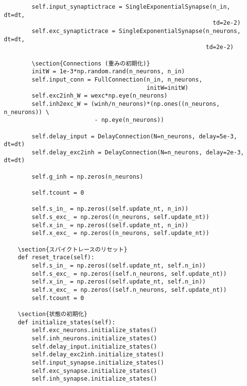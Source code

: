 \begin{verbatim}
        self.input_synaptictrace = SingleExponentialSynapse(n_in, dt=dt,
                                                            td=2e-2)
        self.exc_synaptictrace = SingleExponentialSynapse(n_neurons, dt=dt,
                                                          td=2e-2)
        
        \section{Connections (重みの初期化)}
        initW = 1e-3*np.random.rand(n_neurons, n_in)
        self.input_conn = FullConnection(n_in, n_neurons,
                                         initW=initW)
        self.exc2inh_W = wexc*np.eye(n_neurons)
        self.inh2exc_W = (winh/n_neurons)*(np.ones((n_neurons, n_neurons)) \
                          - np.eye(n_neurons))
        
        self.delay_input = DelayConnection(N=n_neurons, delay=5e-3, dt=dt)
        self.delay_exc2inh = DelayConnection(N=n_neurons, delay=2e-3, dt=dt)

        self.g_inh = np.zeros(n_neurons)
        
        self.tcount = 0

        self.s_in_ = np.zeros((self.update_nt, n_in)) 
        self.s_exc_ = np.zeros((n_neurons, self.update_nt))
        self.x_in_ = np.zeros((self.update_nt, n_in)) 
        self.x_exc_ = np.zeros((n_neurons, self.update_nt))
        
    \section{スパイクトレースのリセット}
    def reset_trace(self):
        self.s_in_ = np.zeros((self.update_nt, self.n_in)) 
        self.s_exc_ = np.zeros((self.n_neurons, self.update_nt))
        self.x_in_ = np.zeros((self.update_nt, self.n_in)) 
        self.x_exc_ = np.zeros((self.n_neurons, self.update_nt))
        self.tcount = 0
    
    \section{状態の初期化}
    def initialize_states(self):
        self.exc_neurons.initialize_states()
        self.inh_neurons.initialize_states()
        self.delay_input.initialize_states()
        self.delay_exc2inh.initialize_states()
        self.input_synapse.initialize_states()
        self.exc_synapse.initialize_states()
        self.inh_synapse.initialize_states()
        

\end{verbatim}
